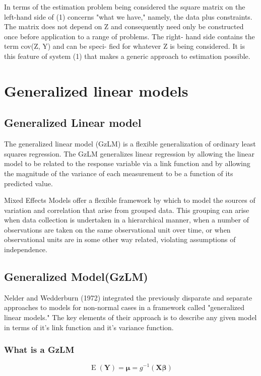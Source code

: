 \documentclass[Main.tex]{subfiles}
\begin{document}
	In terms of the estimation problem being considered the square matrix on the left-hand side of (1) concerns "what we have," namely, the data plus constraints. The matrix does not depend on Z and consequently need only be constructed once before application to a range of problems. The right- hand side contains the term cov(Z, Y) and can be speci- fied for whatever Z is being considered. It is this feature of system (1) that makes a generic approach to estimation possible.



	\chapter{Generalized linear models}
	\section{Generalized Linear model}
The generalized linear model (GzLM) is a flexible generalization of ordinary least squares regression. The GzLM generalizes linear regression by allowing the linear model to be related to the response variable via a link function and by allowing the magnitude of the variance of each measurement to be a function of its predicted value.
	
	
	Mixed Effects Models offer a flexible framework by which to model
	the sources of variation and correlation that arise from grouped
	data. This grouping can arise when data collection is undertaken
	in a hierarchical manner, when a number of observations are taken
	on the same observational unit over time, or when observational
	units are in some other way related, violating assumptions of
	independence.
	
	\section{Generalized  Model(GzLM)}
	
	Nelder and Wedderburn (1972) integrated the previously disparate
	and separate approaches to models for non-normal cases in a
	framework called "generalized linear models."  The key elements of
	their approach is to describe any given model in terms of it's
	link function and it's variance function.
	
	\subsection{What is a GzLM}
	
	\begin{equation}
	\operatorname{E}(\mathbf{Y}) = \boldsymbol{\mu} =
	g^{-1}(\mathbf{X}\boldsymbol{\beta})
	\end{equation}
	
\end{document}
